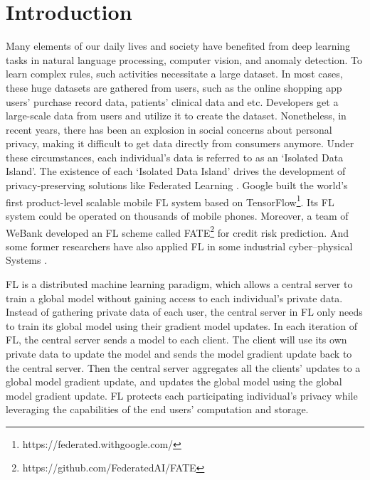 \documentclass[journal]{IEEEtran}
\begin{document}
\section{Introduction}
 Many elements of our daily lives and society have benefited from deep learning tasks in natural language processing, computer vision, and anomaly detection. To learn complex rules, such activities necessitate a large dataset. In most cases, these huge datasets are gathered from users, such as the online shopping app users' purchase record data, patients' clinical data and etc. Developers get a large-scale data from users and utilize it to create the dataset. Nonetheless, in recent years, there has been an explosion in social concerns about personal privacy, making it difficult to get data directly from consumers anymore. Under these circumstances, each individual's data is referred to as an `Isolated Data Island'. The existence of each `Isolated Data Island' drives the development of privacy-preserving solutions like Federated Learning \cite{ref_02_FLConcept}. Google built the world's first product-level scalable mobile FL system based on TensorFlow\footnote{https://federated.withgoogle.com/}. Its FL system could be operated on thousands of mobile phones. Moreover, a team of WeBank developed an FL scheme called FATE\footnote{https://github.com/FederatedAI/FATE} for credit risk prediction. And some former researchers have also applied FL in some industrial cyber–physical Systems \cite{ref_42_FLApp, ref_43_FLApp}.

\par FL is a distributed machine learning paradigm, which allows a central server to train a global model without gaining access to each individual's private data. Instead of gathering private data of each user, the central server in FL only needs to train its global model using their gradient model updates. In each iteration of FL, the central server sends a model to each client. The client will use its own private data to update the model and sends the model gradient update back to the central server. Then the central server aggregates all the clients' updates to a global model gradient update, and updates the global model using the global model gradient update. FL protects each participating individual's privacy while leveraging the capabilities of the end users' computation and storage.
\end{document}
